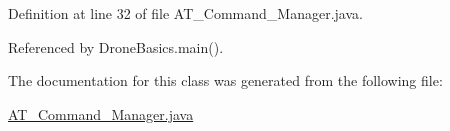 Definition at line 32 of file A\+T\+\_\+\+Command\+\_\+\+Manager.\+java.



Referenced by Drone\+Basics.\+main().



The documentation for this class was generated from the following file\+:\begin{DoxyCompactItemize}
\item 
\hyperlink{_a_t___command___manager_8java}{A\+T\+\_\+\+Command\+\_\+\+Manager.\+java}\end{DoxyCompactItemize}
